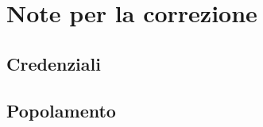 \documentclass[a4paper]{article}
\begin{document}
	\newpage

	
	
	\appendix
	\section{Note per la correzione}
		
		\subsection{Credenziali}
			
		\subsection{Popolamento}
			
    
\end{document}
